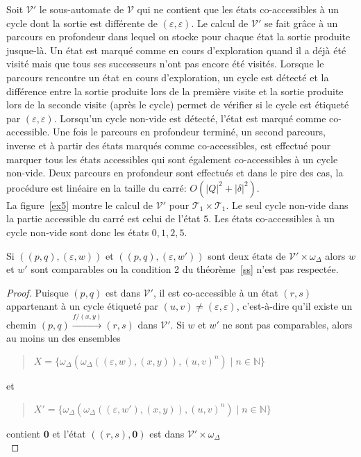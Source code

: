 		Soit $\mathscr{V'}$ le sous-automate de $\mathscr{V}$ qui ne contient que les états co-accessibles à un cycle dont la sortie est différente de $(\varepsilon,\varepsilon)$. Le calcul de $\mathscr{V'}$ se fait grâce à un parcours en profondeur dans lequel on stocke pour chaque état la sortie produite jusque-là. Un état est marqué comme en cours d'exploration quand il a déjà été visité mais que tous ses successeurs n'ont pas encore été visités. Lorsque le parcours rencontre un état en cours d'exploration, un cycle est détecté et la différence entre la sortie produite lors de la première visite et la sortie produite lors de la seconde visite (après le cycle) permet de vérifier si le cycle est étiqueté par $(\varepsilon,\varepsilon)$. Lorsqu'un cycle non-vide est détecté, l'état est marqué comme co-accessible. Une fois le parcours en profondeur terminé, un second parcours, inverse et à partir des états marqués comme co-accessibles, est effectué pour marquer tous les états accessibles qui sont également co-accessibles à un cycle non-vide. Deux parcours en profondeur sont effectués et dans le pire des cas, la procédure est linéaire en la taille du carré: $O(|Q|^2 + |\delta|^2)$. \\
		
		La figure~\ref{ex5} montre le calcul de $\mathscr{V'}$ pour $\mathscr{T}_1 \times \mathscr{T}_1$. Le seul cycle non-vide dans la partie accessible du carré est celui de l'état $5$. Les états co-accessibles à un cycle non-vide sont donc les états $0,1,2,5$.\\
		
		
		
		\begin{lemma}
			Si $((p,q),(\varepsilon,w))$ et $((p,q),(\varepsilon,w'))$ sont deux états de $\mathscr{V'} \times \omega_\Delta$ alors $w$ et $w'$ sont comparables ou la condition 2 du théorème~\ref{ss} n'est pas respectée.
			\label{lem2}
		\end{lemma}
		\begin{proof}
			Puisque $(p,q)$ est dans $\mathscr{V'}$, il est co-accessible à un état $(r,s)$ appartenant à un cycle étiqueté par $(u,v) \neq (\varepsilon,\varepsilon)$, c'est-à-dire qu'il existe un chemin $(p,q) \xrightarrow{f/(x,y)} (r,s)$ dans $\mathscr{V'}$. Si $w$ et $w'$ ne sont pas comparables, alors au moins un des ensembles \begin{quotation}
				$X = \{\omega_\Delta(\omega_\Delta((\varepsilon, w),(x,y)),(u,v)^n) \mid n \in \mathbb{N} \}$
			\end{quotation}
			et
			\begin{quotation}
			$X' = \{\omega_\Delta(\omega_\Delta((\varepsilon, w'),(x,y)),(u,v)^n) \mid n \in \mathbb{N} \}$
			\end{quotation}
			contient $\mathbf{0}$ et l'état $((r,s),\mathbf{0})$ est dans $\mathscr{V'} \times \omega_\Delta$ \\
		\end{proof}
		
